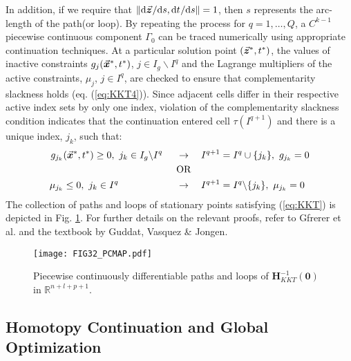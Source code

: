In addition, if we require that
$\Vert \text{d}\vec{\bm{z}}^{}/\text{d}s,\text{d}t^{}/\text{d}s\Vert=1$, then $s$ 
represents the arc-length of the path(or loop). By repeating the process for 
$q=1,\dots,Q$, a $C^{k-1}$ piecewise continuous 
component $\mathit{\Gamma_0}$ can be traced numerically using appropriate 
continuation 
techniques. At a particular solution point $(\vec{\bm{z}}^*,t^*)$, 
the values of inactive constraints $g_j(\vec{\bm{x}}^*,t^*)$, $ j\in I_g\backslash 
I^q$ and the Lagrange
multipliers of the active constraints, $\mu_j$, $j\in I^q$,
are checked to ensure that complementarity slackness holds (eq.
(\ref{eq:KKT4})). Since adjacent cells differ in their respective active index
sets by only one index, violation of the complementarity slackness condition
indicates that the continuation entered cell $\tau(I^{q+1})$ and there is a
unique index, $j_k$, such that:
\begin{align*}
	g_{j_k}(\vec{\bm{x}}^*,t^*)\geq 0,\ j_k\in I_g\backslash I^q\hspace*{0.5cm} 
	&\rightarrow\quad
	I^{q+1}=I^q\cup\{j_k\},\ g_{j_k}=0\\
	&\text{OR}\\
	\mu_{j_k}\leq 0,\ j_k\in I^q \hspace*{2.1cm}&\rightarrow\quad 
	I^{q+1}=I^q\backslash\{j_k\},\
	\mu_{j_k}=0\\
\end{align*}
The collection of paths and loops of stationary points satisfying 
(\ref{eq:KKT}) is depicted in Fig. \ref{fig:FIG32}. For
further details on the relevant proofs, refer to
Gfrerer et al.\cite{Gfrerer:1985} and
the textbook by Guddat, Vasquez \& Jongen\cite{Guddat:1990}.
\begin{figure}[t]
	\centering
	\texttt{[image: FIG32\_PCMAP.pdf]}
	\caption{Piecewise continuously differentiable paths and loops of
		$\bm{H}_{KKT}^{-1}(\bm{0})$ in $\mathbb{R}^{n+l+p+1}$.}
	\label{fig:FIG32}
\end{figure}

\subsection{Homotopy Continuation and Global Optimization}\label{CH4-S1SS4}


